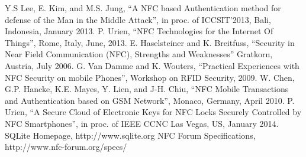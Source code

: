 \documentclass[conference]{IEEEtran}
\begin{document}


%
%
%
\begin{thebibliography}{1}

Y.S Lee, E. Kim, and M.S. Jung, ``A NFC based Authentication method for defense 
of the Man in the Middle Attack'', in proc. of ICCSIT'2013, Bali, Indonesia, January 2013. 
P. Urien, ``NFC Technologies for the Internet Of Things'', Rome, Italy, June, 2013.
E. Haselsteiner and K. Breitfuss, ``Security in Near Field Communication (NFC), Strengths and Weaknesses'' 
Gratkorn, Austria, July 2006.
G. Van Damme and K. Wouters, ``Practical Experiences with NFC Security on mobile Phones'',
Workshop on RFID Security, 2009.
W. Chen, G.P. Hancke, K.E. Mayes, Y. Lien, and J-H. Chiu, ``NFC Mobile Transactions and Authentication based on GSM Network'', 
Monaco, Germany, April 2010.
P. Urien, ``A Secure Cloud of Electronic Keys for NFC Locks Securely Controlled by NFC Smartphones'',
in proc. of IEEE CCNC Las Vegas, US, January 2014.
SQLite Homepage, http://www.sqlite.org
NFC Forum Specifications, http://www.nfc-forum.org/specs/
\end{thebibliography}




\end{document}

